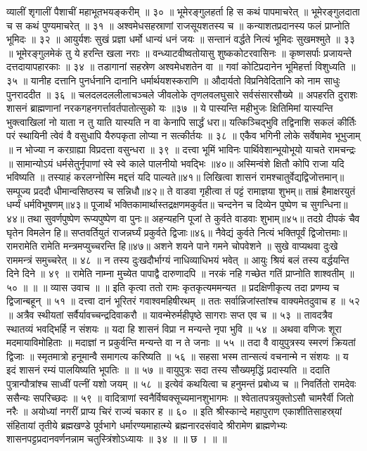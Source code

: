 व्यालीं शृगालीं पैशाचीं महाभूतभयङ्करीम् ॥ ३० ॥
भूमेरङ्गुलहर्ता हि स कथं पापमाचरेत् ॥
भूमेरङ्गुलदाता च स कथं पुण्यमाचरेत् ॥ ३१ ॥
अश्वमेधसहस्राणां राजसूयशतस्य च ॥
कन्याशतप्रदानस्य फलं प्राप्नोति भूमिदः ॥ ३२ ॥
आयुर्यशः सुखं प्रज्ञा धर्मो धान्यं धनं जयः ॥
सन्तानं वर्द्धते नित्यं भूमिदः सुखमश्मुते ॥ ३३ ॥
भूमेरङ्गुलमेकं तु ये हरन्ति खला नराः ॥
वन्ध्याटवीष्वतोयासु शुष्ककोटरवासिनः ॥
कृष्णसर्पाः प्रजायन्ते दत्तदायापहारकाः ॥ ३४ ॥
तडागानां सहस्रेण अश्वमेधशतेन वा ॥
गवां कोटिप्रदानेन भूमिहर्त्ता विशुध्यति ॥ ३५ ॥
यानीह दत्तानि पुनर्धनानि दानानि धर्मार्थयशस्कराणि ॥
औदार्यतो विप्रनिवेदितानि को नाम साधुः पुनराददीत ॥ ३६ ॥
चलदलदललीलाचञ्चले जीवलोके तृणलवलघुसारे सर्वसंसारसौख्ये ॥
अपहरति दुराशः शासनं ब्राह्मणानां नरकगहनगर्त्तावर्तपातोत्सुको यः ॥३७ ॥
ये पास्यन्ति महीभुजः क्षितिमिमां यास्यन्ति भुक्त्वाखिलां नो याता न तु याति यास्यति न वा केनापि सार्द्धं धरा॥
यत्किञ्चिद्भुवि तद्विनाशि सकलं कीर्तिः परं स्थायिनी त्वेवं वै वसुधापि यैरुपकृता लोप्या न सत्कीर्तयः ॥ ३८ ॥
एकैव भगिनी लोके सर्वेषामेव भूभुजाम् ॥
न भोज्या न करग्राह्या विप्रदत्ता वसुन्धरा ॥ ३९ ॥
दत्त्वा भूमिं भाविनः पार्थिवेशान्भूयोभूयो याचते रामचन्द्रः ॥
सामान्योऽयं धर्मसेतुर्नृपाणां स्वे स्वे काले पालनीयो भवद्भिः ॥४०॥
अस्मिन्वंशे क्षितौ कोपि राजा यदि भविष्यति ॥
तस्याहं करलग्नोस्मि मद्दत्तं यदि पाल्यते॥४१॥
लिखित्वा शासनं रामश्चातुर्वेद्यद्विजोत्तमान्॥
सम्पूज्य प्रददौ धीमान्वसिष्ठस्य च सन्निधौ॥४२॥
ते वाडवा गृहीत्वा तं पट्टं रामाज्ञया शुभम्॥
ताम्रं हैमाक्षरयुतं धर्म्यं धर्मविभूषणम्॥४३॥
पूजार्थं भक्तिकामार्थास्तद्रक्षणमकुर्वत॥
चन्दनेन च दिव्येन पुष्पेण च सुगन्धिना॥४४॥
तथा सुवर्णपुष्पेण रूप्यपुष्पेण वा पुनः॥
अहन्यहनि पूजां ते कुर्वते वाडवाः शुभाम्॥४५॥
तदग्रे दीपकं चैव घृतेन विमलेन हि॥
सप्तवर्तियुतं राजन्नर्घ्यं प्रकुर्वते द्विजाः॥४६॥
नैवेद्यं कुर्वते नित्यं भक्तिपूर्वं द्विजोत्तमाः॥
रामरामेति रामेति मन्त्रमप्युच्चरन्ति हि॥४७॥
अशने शयने पाने गमने चोपवेशने ॥
सुखे वाप्यथवा दुःखे राममन्त्रं समुच्चरेत् ॥ ४८ ॥
न तस्य दुःखदौर्भाग्यं नाधिव्याधिभयं भवेत् ॥
आयुः श्रियं बलं तस्य वर्द्धयन्ति दिने दिने ॥ ४९ ॥
रामेति नाम्ना मुच्येत पापाद्वै दारुणादपि ॥
नरकं नहि गच्छेत गतिं प्राप्नोति शाश्वतीम् ॥ ५० ॥ ॥
॥ व्यास उवाच ॥ ॥
इति कृत्वा ततो रामः कृतकृत्यममन्यत ॥
प्रदक्षिणीकृत्य तदा प्रणम्य च द्विजान्बहून् ॥ ५१ ॥
दत्त्वा दानं भूरितरं गवाश्वमहिषीरथम् ॥
ततः सर्वान्निजांस्तांश्च वाक्यमेतदुवाच ह ॥ ५२ ॥
अत्रैव स्थीयतां सर्वैर्यावच्चन्द्रदिवाकरौ ॥
यावन्मेरुर्महीपृष्ठे सागराः सप्त एव च ॥ ५३ ॥
तावदत्रैव स्थातव्यं भवद्भिर्हि न संशयः ॥
यदा हि शासनं विप्रा न मन्यन्ते नृपा भुवि ॥ ५४ ॥
अथवा वणिजः शूरा मदमायाविमोहिताः ॥
मदाज्ञां न प्रकुर्वन्ति मन्यन्ते वा न ते जनाः ॥ ५५ ॥
तदा वै वायुपुत्रस्य स्मरणं क्रियतां द्विजाः ॥
स्मृतमात्रो हनूमान्वै समागत्य करिष्यति ॥ ५६ ॥
सहसा भस्म तान्सत्यं वचनान्मे न संशयः ॥
य इदं शासनं रम्यं पालयिष्यति भूपतिः ॥ ॥ ५७ ॥
वायुपुत्रः सदा तस्य सौख्यमृद्धिं प्रदास्यति ॥
ददाति पुत्रान्पौत्रांश्च साध्वीं पत्नीं यशो जयम् ॥ ५८ ॥
इत्येवं कथयित्वा च हनुमन्तं प्रबोध्य च ॥
निवर्तितो रामदेवः ससैन्यः सपरिच्छदः ॥ ५९ ॥
वादित्राणां स्वनैर्विष्वक्सूच्यमानशुभागमः ॥
श्वेतातपत्रयुक्तोऽसौ चामरैर्वी जितो नरैः ॥
अयोध्यां नगरीं प्राप्य चिरं राज्यं चकार ह ॥ ६० ॥
इति श्रीस्कान्दे महापुराण एकाशीतिसाहस्र्यां संहितायां तृतीये ब्रह्मखण्डे पूर्वभागे धर्मारण्यमाहात्म्ये ब्रह्मनारदसंवादे श्रीरामेण ब्राह्मणेभ्यः शासनपट्टप्रदानवर्णनन्नाम चतुस्त्रिंशोऽध्यायः ॥ ३४ ॥ ॥ छ । ॥ ॥

